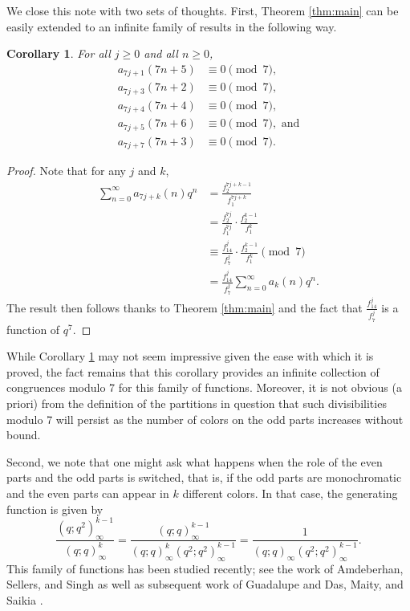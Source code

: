 \documentclass[10pt, reqno]{amsart}
\theoremstyle{theorem}
\newtheorem{corollary}[theorem]{Corollary}
\theoremstyle{definition}
\theoremstyle{example}
\begin{document}
We close this note with two sets of thoughts.  First, Theorem \ref{thm:main} can be easily extended to an infinite family of results in the following way.  
\begin{corollary}
\label{cor:infinite_families}
For all $j\geq 0$ and all $n\geq 0$, 
\begin{align*}
a_{7j+1}(7n+5) & \equiv 0 \pmod{7},  \\
a_{7j+3}(7n+2) & \equiv 0 \pmod{7}, \\
a_{7j+4}(7n+4) & \equiv 0 \pmod{7},  \\
a_{7j+5}(7n+6) & \equiv 0 \pmod{7}, \text{\ \ and}\\
a_{7j+7}(7n+3) & \equiv 0 \pmod{7}.  
\end{align*}
\end{corollary}
\begin{proof}
Note that for any $j$ and $k$, 
\begin{align*}
\sum_{n=0}^\infty a_{7j+k}(n)q^n
&= 
\frac{f_2^{7j+k-1}}{f_1^{7j+k}} \\
&= 
\frac{f_2^{7j}}{f_1^{7j}}\cdot \frac{f_2^{k-1}}{f_1^{k}} \\
&\equiv 
\frac{f_{14}^{j}}{f_7^{j}}\cdot \frac{f_2^{k-1}}{f_1^{k}} \pmod{7} \\
&= 
\frac{f_{14}^{j}}{f_7^{j}}\sum_{n=0}^\infty a_{k}(n)q^n.
\end{align*}
The result then follows thanks to Theorem \ref{thm:main} and the fact that $\frac{f_{14}^{j}}{f_7^{j}}$ is a function of $q^7$.  
\end{proof}
While Corollary \ref{cor:infinite_families} may not seem impressive given the ease with which it is proved, the fact remains that this corollary provides an infinite collection of congruences modulo 7 for this family of functions.  Moreover, it is not obvious (a priori) from the definition of the partitions in question that such divisibilities modulo 7 will persist as the number of colors on the odd parts increases without bound.  

Second, we note that one might ask what happens when the role of the even parts and the odd parts is switched, that is, if the odd parts are monochromatic and the even parts can appear in $k$ different colors.  In that case, the generating function is given by 
$$
\frac{(q;q^2)_\infty^{k-1}}{(q;q)_\infty^k} = \frac{(q;q)_\infty^{k-1}}{(q;q)_\infty^k(q^2;q^2)_\infty^{k-1}} = \frac{1}{(q;q)_\infty (q^2;q^2)_\infty^{k-1}}.
$$ 
This family of functions has been studied recently; see the work of Amdeberhan, Sellers, and Singh \cite{AmSeSi} as well as subsequent work of Guadalupe \cite{Gua2} and Das, Maity, and Saikia \cite{DMS}.  
\end{document}
